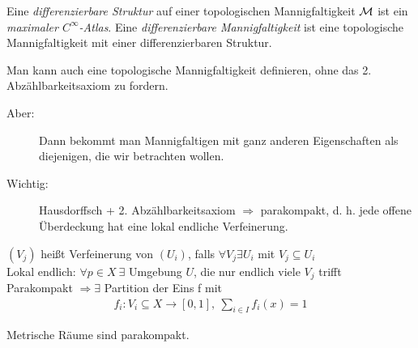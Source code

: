 \begin{defs}
Eine \textit{differenzierbare Struktur} auf einer topologischen Mannigfaltigkeit $\mathcal{M}$ ist ein \textit{maximaler $C^\infty$-Atlas}. Eine \textit{differenzierbare Mannigfaltigkeit} ist eine topologische Mannigfaltigkeit mit einer differenzierbaren Struktur.
\end{defs}

\begin{bem}
Man kann auch eine topologische Mannigfaltigkeit definieren, ohne das 2. Abzählbarkeitsaxiom zu fordern.
\begin{description}
\item[Aber:] Dann bekommt man Mannigfaltigen mit ganz anderen Eigenschaften als diejenigen, die wir betrachten wollen.
\item[Wichtig:] Hausdorffsch + 2. Abzählbarkeitsaxiom $\Rightarrow$ parakompakt, d. h. jede offene Überdeckung hat eine lokal endliche Verfeinerung.
\end{description}
$(V_j)$ heißt Verfeinerung von $(U_i)$, falls $\forall V_j \exists U_i$ mit $V_j \subseteq U_i$\\
Lokal endlich: $\forall p \in X\ \exists$ Umgebung $U$, die nur endlich viele $V_j$ trifft\\
Parakompakt $\Rightarrow \exists$ Partition der Eins f mit 
\begin{align*}
f_i: V_i \subseteq X \rightarrow [0, 1],\ \sum_{i \in I} f_i (x) = 1
\end{align*} 
\end{bem}

\begin{bsp}
Metrische Räume sind parakompakt.
\end{bsp}

